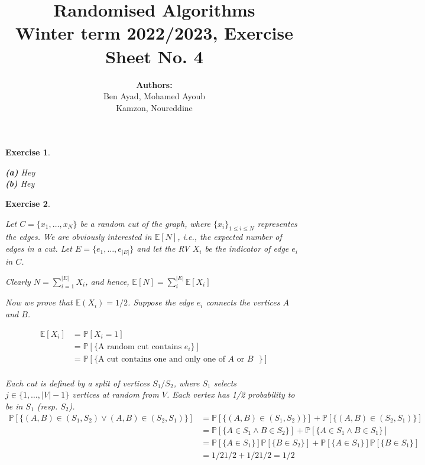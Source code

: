 \documentclass{article}
\title{Randomised Algorithms \\
Winter term 2022/2023, Exercise Sheet No. 4}
\author{
    \textbf{Authors:} \\
    Ben Ayad, Mohamed Ayoub \\
    Kamzon, Noureddine
}
\newtheorem{exo}{Exercise}
\def\P{\mathbb{P}}
\def\E{\mathbb{E}}
\begin{document}
\maketitle


\begin{exo}{\ \\}

\noindent
\textbf{(a)} Hey \\


\noindent
\textbf{(b)} Hey \\


\end{exo}

\begin{exo}{\ \\}

Let $C = \{x_1, \dots, x_N\}$ be a random cut of the graph, where $\{x_i\}_{1\leq i \leq N}$ representes the edges. We are obviously interested in $\E[N]$, i.e., the expected number of edges in a cut. Let $E = \{e_1, \dots, e_{|E|}\}$ and let the RV $X_i$ be the indicator of edge $e_i$ in $C$.


Clearly $\displaystyle N = \sum_{i=1}^{|E|}X_i$, and hence, $\displaystyle \E[N]= \sum_i^{|E|} \E[X_i]$

Now we prove that $\E (X_i) = 1/2$. Suppose the edge $e_i$ connects the vertices $A$ and $B$. 

\begin{align*}
    \E[X_i] &= \P[X_i=1] \\
            &= \P[\{\text{A random cut contains $e_i$}\}] \\
            &= \P[\{\text{A cut contains one and only one of $A$ or $B$  }\}] \\
\end{align*}

Each cut is defined by a split of vertices $S_1 / S_2$, where $S_1$ selects $j \in \{1, \dots, |V|-1\}$ vertices at random from $V$. Each vertex has 1/2 probability to be in $S_1$ (resp. $S_2$). 
\begin{align*}
    \P[\{ (A,B)\in (S_1, S_2) \lor (A,B)\in (S_2, S_1)\}] &= \P[\{ (A,B)\in (S_1, S_2)\}] + \P[\{(A,B)\in (S_2, S_1)\}] \\
                                                          &= \P[\{ A \in S_1 \land B \in S_2 \}] + \P[\{  A \in S_1 \land B \in S_1\}] \\
                                                          &= \P[\{ A \in S_1\}]\P[\{ B \in S_2 \}] + \P[\{A \in S_1\}] \P[\{B \in S_1\}] \\
                                                          &= 1/2 1/2 + 1/2 1/2 = 1/2
\end{align*}


\end{exo}
\end{document}
